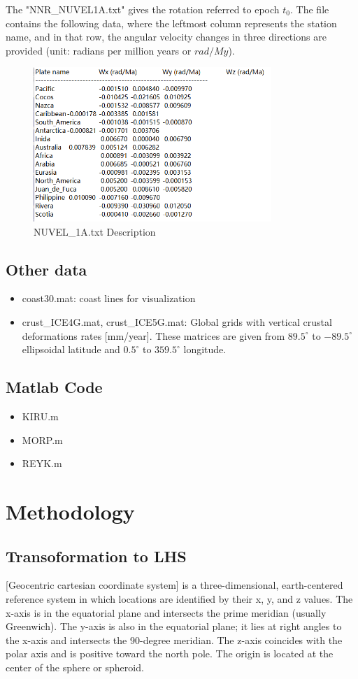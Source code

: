 \documentclass{article}
\begin{document}
The "NNR\_NUVEL1A.txt" gives the rotation referred to epoch $t_0$. 
The file contains the following data, where the leftmost column represents the station name, 
and in that row, the angular velocity changes in three directions are provided (unit: radians per million years or $rad/My$).
\begin{figure}[H]
    \centering
    \includegraphics[width=9cm]{../source/nuvel.png}
    \caption{NUVEL\_1A.txt Description}
    \label{fig:Nuvel-1A}
\end{figure}

\subsection{Other data}
\begin{itemize}
  \item coast30.mat: coast lines for visualization
  \item crust\_ICE4G.mat, crust\_ICE5G.mat: Global grids with vertical crustal deformations rates [mm/year].
  These matrices are given from $89.5^{\circ}$ to $-89.5^{\circ}$ ellipsoidal latitude and $0.5^{\circ}$ to $359.5^{\circ}$ longitude.
\end{itemize}

\subsection{Matlab Code}
\begin{itemize}
  \item KIRU.m
  \item MORP.m
  \item REYK.m
\end{itemize}


\section{Methodology}
\subsection{Transoformation to LHS}
[Geocentric cartesian coordinate system] is a three-dimensional, earth-centered reference system in which locations are identified by their x, y, and z values. 
The x-axis is in the equatorial plane and intersects the prime meridian (usually Greenwich). 
The y-axis is also in the equatorial plane; it lies at right angles to the x-axis and intersects the 90-degree meridian. 
The z-axis coincides with the polar axis and is positive toward the north pole. The origin is located at the center of the sphere or spheroid.
\end{document}
